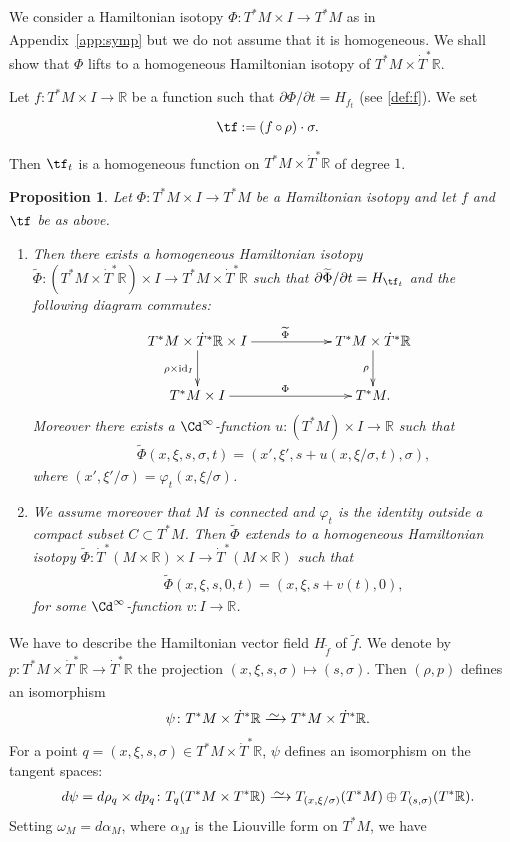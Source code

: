 \documentclass[12pt,leqno]{article}
\newtheorem{proposition}[theorem]{Proposition}
\theoremstyle{definition}
\newcommand{\R}{{\mathbb{R}}}
\def\phi{{\varphi}}
\renewcommand{\to}[1][]{\xrightarrow[]{#1}}
\newcommand{\isoto}[1][]{\xrightarrow[#1]%
{{\raisebox{-.6ex}[0ex][-.6ex]{$\mspace{1mu}\sim\mspace{2mu}$}}}}
\newcommand{\conv}[1][]{\mathop{\circ}\limits_{#1}}
\newcommand{\seteq}{\mathbin{:=}}
\newcommand{\cl}{\colon}
\newcommand{\tw}[1]{\widetilde{#1}}
\newcommand{\bnum}{\begin{enumerate}[{\rm(i)}]}
\newcommand{\enum}{\end{enumerate}}
\newcommand{\eq}{\begin{eqnarray}}
\newcommand{\eneq}{\end{eqnarray}}
\newcommand{\eqn}{\begin{eqnarray*}}
\newcommand{\eneqn}{\end{eqnarray*}}
\DeclareMathOperator{\id}{id}
\newcommand{\dT}{{\dot{T}}}
\numberwithin{equation}{section}
\begin{document}
We consider a Hamiltonian isotopy $\Phi\cl T^*M\times I\to T^*M$ as in
Appendix~\ref{app:symp} but we do not assume that
it is homogeneous.
We shall show that $\Phi$ lifts to a homogeneous Hamiltonian isotopy of 
$T^*M\times \dT^*\R$.

Let $f\cl T^*M\times I\to\R$ be a function 
such that $\partial\Phi/\partial t=H_{f_t}$ (see \eqref{def:f}).
We set
\eqn
&&\tf\seteq(f\conv \rho)\cdot \sigma. 
\eneqn
Then $\tf_t$ is a homogeneous 
function on $T^*M\times \dT^*\R$ of degree $1$.

\begin{proposition}\label{prop:homogenisation}
Let $\Phi\cl T^*M\times I\to T^*M$ be a Hamiltonian isotopy
and let $f$ and $\tf$ be as above.
\bnum
\item
Then there exists a homogeneous Hamiltonian isotopy
$\tw \Phi\cl (T^*M\times \dT^*\R)\times I\to T^*M\times \dT^*\R$
such that $\partial\tw\Phi/\partial t=H_{\tf_t}$ and 
the following diagram commutes:
\eqn
&&\xymatrix@C=2cm{
T^*M\times\dT^*\R\times I\ar[r]^{\tw\Phi}\ar[d]_{\rho\times\id_I}
                                       &T^*M\times\dT^*\R\ar[d]_\rho  \\
T^*M\times I\ar[r]^{\Phi}              & T^*M .
}\eneqn
Moreover there exists a $\Cd^\infty$-function $u\cl (T^*M) \times I\to\R$ 
such that
\eq\label{eq:twphi}
&&\tw \Phi(x,\xi,s,\sigma,t) = (x',\xi', s+ u(x,\xi/\sigma,t),\sigma),
\eneq
where $(x',\xi'/\sigma) = \phi_t(x,\xi/\sigma)$.
\item We assume moreover that 
$M$ is connected and 
$\phi_t$ is the identity outside a compact subset $C\subset T^*M$.
Then $\tw \Phi$ extends to a homogeneous Hamiltonian isotopy
$\tw \Phi\cl \dT^*(M\times \R)\times I\to \dT^*(M\times\R)$ such that
\eq\label{eq:twphi2}
&&\tw \Phi(x,\xi,s,0,t) = (x,\xi, s+ v(t),0),
\eneq
for some $\Cd^\infty$-function $v\cl I\to\R$.
\enum
\end{proposition}
\Proof
We have to describe the Hamiltonian vector field $H_{\tw f}$ of $\tw f$.
We denote by $p\cl T^*M\times \dT^*\R \to\dT^*\R$ the projection
$(x,\xi,s,\sigma) \mapsto (s,\sigma)$.
Then $(\rho,p)$ defines an isomorphism
\eq
&&\psi\cl T^*M\times \dT^*\R\isoto T^*M\times \dT^*\R.
\eneq
For a point $q= (x,\xi,s,\sigma)\in  T^*M\times\dT^*\R$,
$\psi$ defines an isomorphism on the tangent spaces:
\eq
\label{eq:dec-tan-space}
&& d\psi=d\rho_q \times dp_q \cl T_q(T^*M\times T^*\R )
\isoto T_{(x,\xi/\sigma)}(T^*M) \oplus T_{(s,\sigma)}(T^*\R).
\eneq
Setting $\omega_M = d\alpha_M$, where $\alpha_M$ is the Liouville form on
$T^*M$, we have
\end{document}
